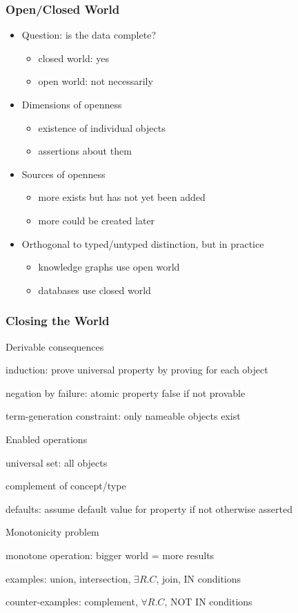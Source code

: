 \documentclass{beamer}
\begin{document}
\begin{frame}\frametitle{Open/Closed World}
\begin{itemize}
\item Question: is the data complete?
 \begin{itemize}
 \item closed world: yes
 \item open world: not necessarily
 \end{itemize}
\item Dimensions of openness
 \begin{itemize}
  \item existence of individual objects
  \item assertions about them
 \end{itemize}
\item Sources of openness
  \begin{itemize}
  \item more exists but has not yet been added
  \item more could be created later
  \end{itemize}
\item Orthogonal to typed/untyped distinction, but in practice
 \begin{itemize}
 \item knowledge graphs use open world
 \item databases use closed world
 \end{itemize}
\end{itemize}
\end{frame}

\begin{frame}\frametitle{Closing the World}
\begin{blockitems}{Derivable consequences}
 \item induction: prove universal property by proving for each object
 \item negation by failure: atomic property false if not provable
 \item term-generation constraint: only nameable objects exist
\end{blockitems}

\begin{blockitems}{Enabled operations}
 \item universal set: all objects
 \item complement of concept/type
 \item defaults: assume default value for property if not otherwise asserted
\end{blockitems}

\begin{blockitems}{Monotonicity problem}
 \item monotone operation: bigger world = more results
 \item examples: union, intersection, $\exists R.C$, join, IN conditions
 \item counter-examples: complement, $\forall R.C$, NOT IN conditions
\end{blockitems}
\end{frame}
\end{document}
